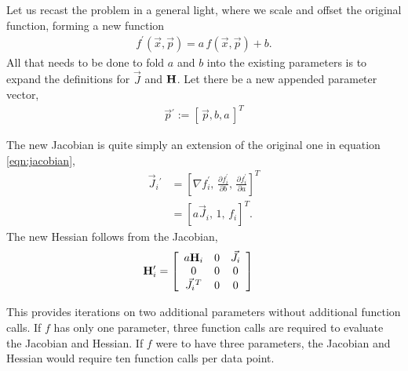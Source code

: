 \documentclass{article}
\def\x{\vec{x}}
\def\p{\vec{p}}
\def\J{\vec{J}}
\def\H{{\bf H}}
\begin{document}
Let us recast the problem in a general light, where we scale and offset the original function, forming a new function
\begin{align}
f^\prime(\x,\p) = a\,f(\x,\p) + b.
\end{align}
All that needs to be done to fold $a$ and $b$ into the existing parameters is to expand the definitions for $\J$ and $\H$.  Let there be a new appended parameter vector,
\begin{align}
\p{^\prime} := [\,\p, b, a\,]^T
\end{align}

The new Jacobian is quite simply an extension of the original one in equation \ref{eqn:jacobian},
\begin{align}
\J_i{^\prime} &= \left[ \nabla f_i^\prime,\, \frac{\partial f_i^\prime}{\partial b},\, \frac{\partial f_i^\prime}{\partial a} \right]^T\nonumber\\
 &= \left[ a\J_i,\, 1,\, f_i \right]^T.
\end{align}
The new Hessian follows from the Jacobian,
\begin{align}
\H_i^\prime &= \left[ \begin{array}{ccc}
a\H_i & 0 & \J_i\\
0 & 0 & 0\\
\J_i{^T} & 0 & 0
\end{array}\right]
\end{align}

This provides iterations on two additional parameters without additional function calls.  If $f$ has only one parameter, three function calls are required to evaluate the Jacobian and Hessian.  If $f$ were to have three parameters, the Jacobian and Hessian would require ten function calls per data point.
\end{document}
